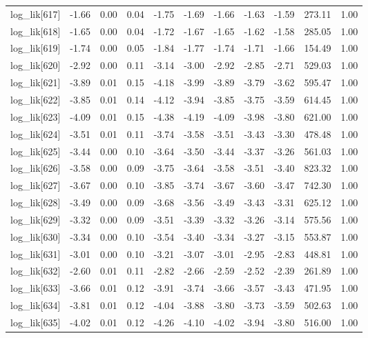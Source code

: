 \begin{table}[ht]
\begin{tabular}{rrrrrrrrrrr}
  log\_lik[617] & -1.66 & 0.00 & 0.04 & -1.75 & -1.69 & -1.66 & -1.63 & -1.59 & 273.11 & 1.00 \\ 
  log\_lik[618] & -1.65 & 0.00 & 0.04 & -1.72 & -1.67 & -1.65 & -1.62 & -1.58 & 285.05 & 1.00 \\ 
  log\_lik[619] & -1.74 & 0.00 & 0.05 & -1.84 & -1.77 & -1.74 & -1.71 & -1.66 & 154.49 & 1.00 \\ 
  log\_lik[620] & -2.92 & 0.00 & 0.11 & -3.14 & -3.00 & -2.92 & -2.85 & -2.71 & 529.03 & 1.00 \\ 
  log\_lik[621] & -3.89 & 0.01 & 0.15 & -4.18 & -3.99 & -3.89 & -3.79 & -3.62 & 595.47 & 1.00 \\ 
  log\_lik[622] & -3.85 & 0.01 & 0.14 & -4.12 & -3.94 & -3.85 & -3.75 & -3.59 & 614.45 & 1.00 \\ 
  log\_lik[623] & -4.09 & 0.01 & 0.15 & -4.38 & -4.19 & -4.09 & -3.98 & -3.80 & 621.00 & 1.00 \\ 
  log\_lik[624] & -3.51 & 0.01 & 0.11 & -3.74 & -3.58 & -3.51 & -3.43 & -3.30 & 478.48 & 1.00 \\ 
  log\_lik[625] & -3.44 & 0.00 & 0.10 & -3.64 & -3.50 & -3.44 & -3.37 & -3.26 & 561.03 & 1.00 \\ 
  log\_lik[626] & -3.58 & 0.00 & 0.09 & -3.75 & -3.64 & -3.58 & -3.51 & -3.40 & 823.32 & 1.00 \\ 
  log\_lik[627] & -3.67 & 0.00 & 0.10 & -3.85 & -3.74 & -3.67 & -3.60 & -3.47 & 742.30 & 1.00 \\ 
  log\_lik[628] & -3.49 & 0.00 & 0.09 & -3.68 & -3.56 & -3.49 & -3.43 & -3.31 & 625.12 & 1.00 \\ 
  log\_lik[629] & -3.32 & 0.00 & 0.09 & -3.51 & -3.39 & -3.32 & -3.26 & -3.14 & 575.56 & 1.00 \\ 
  log\_lik[630] & -3.34 & 0.00 & 0.10 & -3.54 & -3.40 & -3.34 & -3.27 & -3.15 & 553.87 & 1.00 \\ 
  log\_lik[631] & -3.01 & 0.00 & 0.10 & -3.21 & -3.07 & -3.01 & -2.95 & -2.83 & 448.81 & 1.00 \\ 
  log\_lik[632] & -2.60 & 0.01 & 0.11 & -2.82 & -2.66 & -2.59 & -2.52 & -2.39 & 261.89 & 1.00 \\ 
  log\_lik[633] & -3.66 & 0.01 & 0.12 & -3.91 & -3.74 & -3.66 & -3.57 & -3.43 & 471.95 & 1.00 \\ 
  log\_lik[634] & -3.81 & 0.01 & 0.12 & -4.04 & -3.88 & -3.80 & -3.73 & -3.59 & 502.63 & 1.00 \\ 
  log\_lik[635] & -4.02 & 0.01 & 0.12 & -4.26 & -4.10 & -4.02 & -3.94 & -3.80 & 516.00 & 1.00 \\ 

\end{tabular}
\end{table}
